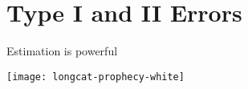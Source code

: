 \documentclass[t]{beamer}
\begin{document}
  \section{Type I and II Errors}


  
  \begin{frame}[plain, c]{Estimation is powerful}

    \begin{center}
      \texttt{[image: longcat-prophecy-white]}
    \end{center}
      
  \end{frame}
\end{document}
